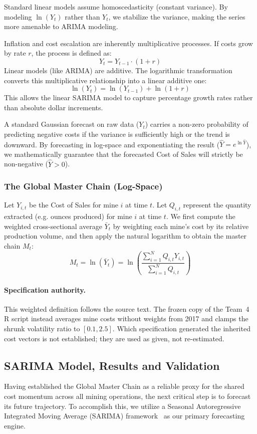Standard linear models assume homoscedasticity (constant variance). By modeling $\ln(Y_t)$ rather than $Y_t$, we stabilize the variance, making the series more amenable to ARIMA modeling.

Inflation and cost escalation are inherently multiplicative processes. If costs grow by rate $r$, the process is defined as:
\[ Y_t = Y_{t-1} \cdot (1+r) \]
Linear models (like ARIMA) are additive. The logarithmic transformation converts this multiplicative relationship into a linear additive one:
\[ \ln(Y_t) = \ln(Y_{t-1}) + \ln(1+r) \]
This allows the linear SARIMA model to capture percentage growth rates rather than absolute dollar increments.

A standard Gaussian forecast on raw data ($Y_t$) carries a non-zero probability of predicting negative costs if the variance is sufficiently high or the trend is downward. By forecasting in log-space and exponentiating the result ($\hat{Y} = e^{\ln \hat{Y}}$), we mathematically guarantee that the forecasted Cost of Sales will strictly be non-negative ($\hat{Y} > 0$).
\subsubsection{The Global Master Chain (Log-Space)}
\begin{definition}
Let $Y_{i,t}$ be the Cost of Sales for mine $i$ at time $t$. Let $Q_{i,t}$ represent the quantity extracted (e.g. ounces produced) for mine $i$ at time $t$. We first compute the weighted cross-sectional average $\bar{Y}_t$ by weighting each mine's cost by its relative production volume, and then apply the natural logarithm to obtain the master chain $M_t$:
\[
M_t = \ln(\bar{Y}_t) = \ln\left( \frac{\sum_{i=1}^{N} Q_{i,t} Y_{i,t}}{\sum_{i=1}^{N} Q_{i,t}} \right)
\]
\end{definition}
\paragraph{Specification authority.} This weighted definition follows the source text. The frozen copy of the Team~4 R script instead averages mine costs without weights from 2017 and clamps the shrunk volatility ratio to $[0.1,2.5]$. Which specification generated the inherited cost vectors is not established; they are used as given, not re-estimated.
\subsection{SARIMA Model, Results and Validation}
Having established the Global Master Chain as a reliable proxy for the shared cost momentum across all mining operations, the next critical step is to forecast its future trajectory. To accomplish this, we utilize a Seasonal Autoregressive Integrated Moving Average (SARIMA) framework~\cite{BoxJenkins1970} as our primary forecasting engine. 

